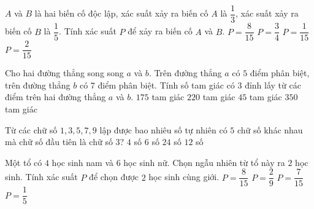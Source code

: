 \begin{ex}%
	$A$ và $B$ là hai biến cố độc lập, xác suất xảy ra biến cố $A$ là $\dfrac{1}{3}$, xác suất xảy ra biến cố $B$ là $\dfrac{1}{5}$. Tính xác suất $P$ để xảy ra biến cố $A$ và $B$.
	\choice
	{$P=\dfrac{8}{15}$}
	{$P=\dfrac{3}{4}$}
	{\True $P=\dfrac{1}{15}$}
	{$P=\dfrac{2}{15}$}
\end{ex}
\begin{ex}%
	Cho hai đường thẳng song song $a$ và $b$. Trên đường thẳng $a$ có $5$ điểm phân biệt, trên đường thẳng $b$ có $7$ điểm phân biệt. Tính số tam giác có $3$ đỉnh lấy từ các điểm trên hai đường thẳng $a$ và $b$.
	\choice
	{\True $175$ tam giác}
	{$220$ tam giác}
	{$45$ tam giác}
	{$350$ tam giác}
\end{ex}
\begin{ex}%
	Từ các chữ số $1, 3, 5, 7, 9$ lập được bao nhiêu số tự nhiên có $5$ chữ số khác nhau mà chữ số đầu tiên là chữ số $3$?
	\choice
	{$4$ số}
	{$6$ số}
	{\True $24$ số}
	{$12$ số}
\end{ex}
\begin{ex}%
	Một tổ có $4$ học sinh nam và $6$ học sinh nữ. Chọn ngẫu nhiên từ tổ này ra $2$ học sinh. Tính xác suất $P$ để chọn được $2$ học sinh cùng giới.
	\choice
	{$P=\dfrac{8}{15}$}
	{$P=\dfrac{2}{9}$}
	{\True $P=\dfrac{7}{15}$}
	{$P=\dfrac{1}{5}$}
\end{ex}
